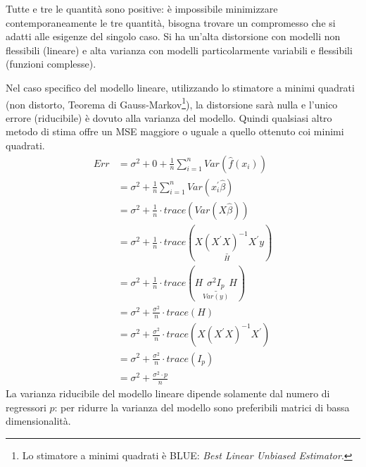 \documentclass[12pt, a4page]{article}
\begin{document}
Tutte e tre le quantità sono positive: è impossibile minimizzare contemporaneamente le tre quantità, bisogna trovare un compromesso che si adatti alle esigenze del singolo caso.
Si ha un'alta distorsione con modelli non flessibili (lineare) e alta varianza con modelli particolarmente variabili e flessibili (funzioni complesse).

Nel caso specifico del modello lineare, utilizzando lo stimatore a minimi quadrati (non distorto, Teorema di Gauss-Markov\footnote{Lo stimatore a minimi quadrati è BLUE: \textit{Best Linear Unbiased Estimator}.}), la distorsione sarà nulla e l'unico errore (riducibile) è dovuto alla varianza del modello.
Quindi qualsiasi altro metodo di stima offre un MSE maggiore o uguale a quello ottenuto coi minimi quadrati.
\begin{align*}
  Err &= \sigma^2 + 0 + \frac{1}{n} \sum_{i=1}^n Var(\hat{f}(x_i)) \\
      &= \sigma^2 + \frac{1}{n} \sum_{i=1}^n Var(x_i^{\prime} \hat{\beta}) \\
      &= \sigma^2 + \frac{1}{n} \cdot trace (Var(X \hat{\beta})) \\
      &= \sigma^2 + \frac{1}{n} \cdot trace (\underset{H}{\underline{X (X^{\prime}X)^{-1} X^{\prime}}} y) \\
      &= \sigma^2 + \frac{1}{n} \cdot trace (H \underset{Var(y)}{\underline{\sigma^2 I_p}} H) \\
      &= \sigma^2 + \frac{\sigma^2}{n} \cdot trace(H) \\
      &= \sigma^2 + \frac{\sigma^2}{n} \cdot trace(X(X^{\prime}X)^{-1}X^{\prime}) \\
      &= \sigma^2 + \frac{\sigma^2}{n} \cdot trace(I_p) \\
      &= \sigma^2 + \frac{\sigma^2 \cdot p}{n}
\end{align*}
La varianza riducibile del modello lineare dipende solamente dal numero di regressori $p$: per ridurre la varianza del modello sono preferibili matrici di bassa dimensionalità.
\end{document}
